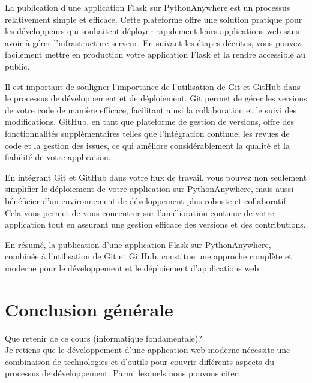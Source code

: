 \documentclass[a4paper,11pt]{article}
\begin{document}
    \begin{tcolorbox}[colback=lightgray!6, colframe=black, left=2mm, right=5mm, top=2mm, bottom=2mm, boxrule=0.1mm]
        La publication d'une application Flask sur PythonAnywhere est un processus relativement simple et efficace. Cette plateforme offre une solution pratique pour les développeurs qui souhaitent déployer rapidement leurs applications web sans avoir à gérer l'infrastructure serveur. En suivant les étapes décrites, vous pouvez facilement mettre en production votre application Flask et la rendre accessible au public.

        Il est important de souligner l'importance de l'utilisation de Git et GitHub dans le processus de développement et de déploiement. Git permet de gérer les versions de votre code de manière efficace, facilitant ainsi la collaboration et le suivi des modifications. GitHub, en tant que plateforme de gestion de versions, offre des fonctionnalités supplémentaires telles que l'intégration continue, les revues de code et la gestion des issues, ce qui améliore considérablement la qualité et la fiabilité de votre application.

        En intégrant Git et GitHub dans votre flux de travail, vous pouvez non seulement simplifier le déploiement de votre application sur PythonAnywhere, mais aussi bénéficier d'un environnement de développement plus robuste et collaboratif. Cela vous permet de vous concentrer sur l'amélioration continue de votre application tout en assurant une gestion efficace des versions et des contributions.

        En résumé, la publication d'une application Flask sur PythonAnywhere, combinée à l'utilisation de Git et GitHub, constitue une approche complète et moderne pour le développement et le déploiement d'applications web.
    \end{tcolorbox}
    
    \newpage
    \section{Conclusion générale}
        \noindent Que retenir de ce cours (informatique fondamentale)?\\

        \noindent Je retiens que le développement d'une application web moderne nécessite une combinaison de technologies et 
        d'outils pour couvrir différents aspects du processus de développement. Parmi lesquels nous pouvons citer: 
\end{document}
